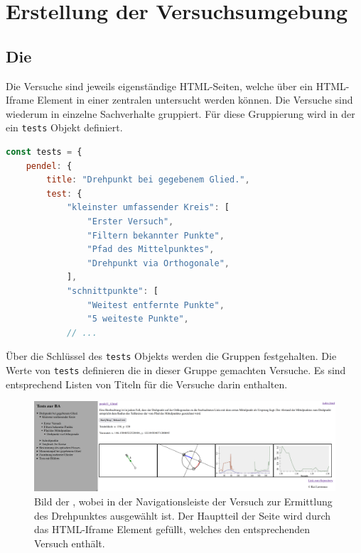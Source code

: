 
\chapter{Erstellung der Versuchsumgebung}


\section{Die }

Die Versuche sind jeweils eigenständige HTML-Seiten, welche über ein HTML-Iframe Element in einer zentralen  untersucht werden können.
Die Versuche sind wiederum in einzelne Sachverhalte gruppiert.
Für diese Gruppierung wird in der  ein \lstinline{tests} Objekt definiert.

\begin{lstlisting}[language=JavaScript, caption={Ausschnitt der Definition des \lstinline{tests} Objekts in der \name{index.html}.}, label={lst:tests_objekt}]
const tests = {
    pendel: {
        title: "Drehpunkt bei gegebenem Glied.",
        test: {
            "kleinster umfassender Kreis": [
                "Erster Versuch",
                "Filtern bekannter Punkte",
                "Pfad des Mittelpunktes",
                "Drehpunkt via Orthogonale",
            ],
            "schnittpunkte": [
                "Weitest entfernte Punkte",
                "5 weiteste Punkte",
            // ...
\end{lstlisting}

Über die Schlüssel des \lstinline{tests} Objekts werden die Gruppen festgehalten.
Die Werte von \lstinline{tests} definieren die in dieser Gruppe gemachten Versuche.
Es sind entsprechend Listen von Titeln für die Versuche darin enthalten.

\begin{figure}
    \includegraphics[width=\textwidth]{gfx/index.png}
    \caption[Bild der ]{Bild der , wobei in der Navigationsleiste der Versuch zur Ermittlung des Drehpunktes ausgewählt ist. Der Hauptteil der Seite wird durch das HTML-Iframe Element gefüllt, welches den entsprechenden Versuch enthält.}\label{fig:index.html}
\end{figure}

